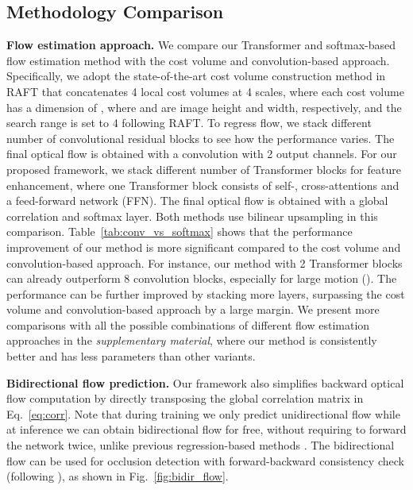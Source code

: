 \documentclass[10pt,twocolumn,letterpaper]{article}
\begin{document}
\subsection{Methodology Comparison}
\label{sec:method_comp}


{\bf Flow estimation approach.} We compare our Transformer and softmax-based flow estimation method with the cost volume and convolution-based approach. Specifically, we adopt the state-of-the-art cost volume construction method in RAFT \cite{teed2020raft} that concatenates 4 local cost volumes at 4 scales, where each cost volume has a dimension of , where  and  are image height and width, respectively, and the search range  is set to 4 following RAFT. To regress flow, we stack different number of convolutional residual blocks \cite{he2016deep} to see how the performance varies. The final optical flow is obtained with a  convolution with 2 output channels. For our proposed framework, we stack different number of Transformer blocks for feature enhancement, where one Transformer block consists of self-, cross-attentions and a feed-forward network (FFN). The final optical flow is obtained with a global correlation and softmax layer. Both methods use bilinear upsampling in this comparison. Table~\ref{tab:conv_vs_softmax} shows that the performance improvement of our method is more significant compared to the cost volume and convolution-based approach. For instance, our method with 2 Transformer blocks can already outperform 8 convolution blocks, especially for large motion (). The performance can be further improved by stacking more layers, surpassing the cost volume and convolution-based approach by a large margin. We present more comparisons with all the possible combinations of different flow estimation approaches in the \emph{supplementary material}, where our method is consistently better and has less parameters than other variants.


{\bf Bidirectional flow prediction.} Our framework also simplifies backward optical flow computation by directly transposing the global correlation matrix in Eq.~\eqref{eq:corr}. Note that during training we only predict unidirectional flow while at inference we can obtain bidirectional flow for free, without requiring to forward the network twice, unlike previous regression-based methods \cite{meister2018unflow,hur2019iterative}. The bidirectional flow can be used for occlusion detection with forward-backward consistency check (following \cite{meister2018unflow}), as shown in Fig.~\ref{fig:bidir_flow}.
\end{document}
